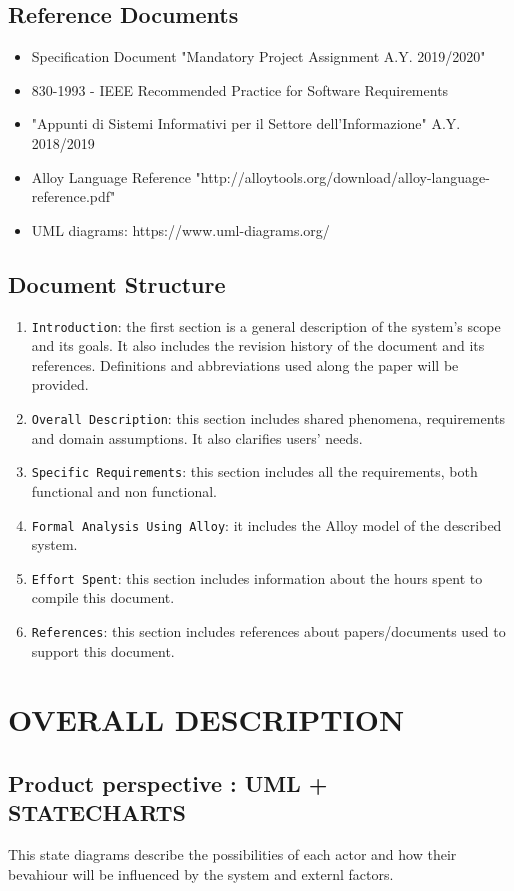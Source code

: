 \documentclass[12pt,a4paper]{article}
\begin{document}
\subsection{Reference	Documents} 
\begin{itemize}
				\item Specification Document "Mandatory Project Assignment A.Y. 2019/2020"
				\item 830-1993 - IEEE Recommended Practice for Software Requirements
				\item "Appunti di Sistemi Informativi per il Settore dell'Informazione" A.Y. 2018/2019
				\item Alloy Language Reference "http://alloytools.org/download/alloy-language-reference.pdf"
				\item UML diagrams: https://www.uml-­diagrams.org/
			\end{itemize}
\subsection{Document	Structure} 
\begin{enumerate}
			\item \texttt{Introduction}: the first section is a general description of the system's scope and its goals. It also includes the revision history of the document and its references. Definitions and abbreviations used along the paper will be provided.
			\item \texttt{Overall Description}: this section includes shared phenomena, requirements and domain assumptions. It also clarifies users' needs.
			\item \texttt{Specific Requirements}: this section includes all the requirements, both functional and non functional.
			\item \texttt{Formal Analysis Using Alloy}: it includes the Alloy model of the described system.
			\item \texttt{Effort Spent}: this section includes information about the hours spent to compile this document.
			\item \texttt{References}: this section includes references about papers/documents used to support this document.
		\end{enumerate}
\section{OVERALL	DESCRIPTION}
\subsection{Product	perspective : UML + STATECHARTS} 
This state diagrams describe the possibilities of each actor and how their bevahiour will be influenced by the system and externl factors.
\end{document}

